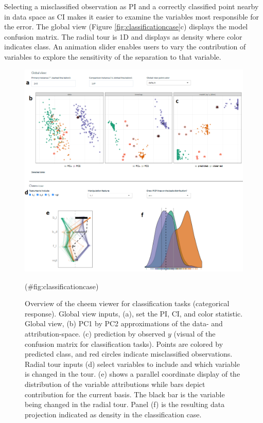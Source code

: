 \documentclass[
]{jss}
\begin{document}
Selecting a misclassified observation as PI and a correctly classified point nearby in data space as CI makes it easier to examine the variables most responsible for the error. The global view (Figure \ref{fig:classificationcase}c) displays the model confusion matrix. The radial tour is 1D and displays as density where color indicates class. An animation slider enables users to vary the contribution of variables to explore the sensitivity of the separation to that variable.

\begin{CodeChunk}
\begin{figure}

{\centering \includegraphics[width=1\linewidth]{./figures/app_classification} 

}

\caption[Overview of the cheem viewer for classification tasks (categorical response)]{Overview of the cheem viewer for classification tasks (categorical response). Global view inputs, (a), set the PI, CI, and color statistic. Global view, (b) PC1 by PC2 approximations of the data- and attribution-space. (c) prediction by observed $y$ (visual of the confusion matrix for classification tasks). Points are colored by predicted class, and red circles indicate misclassified observations. Radial tour inputs (d) select variables to include and which variable is changed in the tour. (e) shows a parallel coordinate display of the distribution of the variable attributions while bars depict contribution for the current basis. The black bar is the variable being changed in the radial tour. Panel (f) is the resulting data projection indicated as density in the classification case.}(\#fig:classificationcase)
\end{figure}
\end{CodeChunk}
\end{document}
